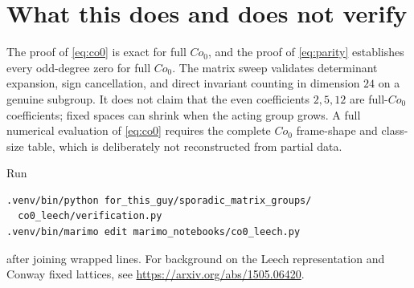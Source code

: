 \documentclass[11pt]{article}
\begin{document}
\section{What this does and does not verify}
The proof of \eqref{eq:co0} is exact for full $Co_0$, and the proof of
\eqref{eq:parity} establishes every odd-degree zero for full $Co_0$.  The
matrix sweep validates determinant expansion, sign cancellation, and direct
invariant counting in dimension $24$ on a genuine subgroup.  It does not
claim that the even coefficients $2,5,12$ are full-$Co_0$ coefficients; fixed
spaces can shrink when the acting group grows.  A full numerical evaluation
of \eqref{eq:co0} requires the complete $Co_0$ frame-shape and class-size
table, which is deliberately not reconstructed from partial data.

Run
\begin{verbatim}
.venv/bin/python for_this_guy/sporadic_matrix_groups/
  co0_leech/verification.py
.venv/bin/marimo edit marimo_notebooks/co0_leech.py
\end{verbatim}
after joining wrapped lines.  For background on the Leech representation and
Conway fixed lattices, see \url{https://arxiv.org/abs/1505.06420}.
\end{document}
